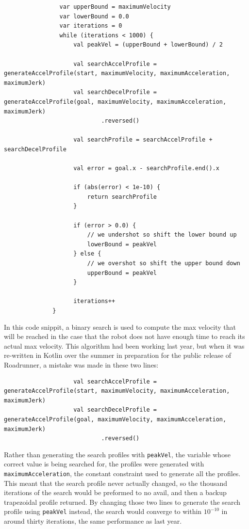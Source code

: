 \documentclass{article}
\begin{document}
\begin{lstlisting}
                var upperBound = maximumVelocity
                var lowerBound = 0.0
                var iterations = 0
                while (iterations < 1000) {
                    val peakVel = (upperBound + lowerBound) / 2

                    val searchAccelProfile = generateAccelProfile(start, maximumVelocity, maximumAcceleration, maximumJerk)
                    val searchDecelProfile = generateAccelProfile(goal, maximumVelocity, maximumAcceleration, maximumJerk)
                            .reversed()

                    val searchProfile = searchAccelProfile + searchDecelProfile

                    val error = goal.x - searchProfile.end().x

                    if (abs(error) < 1e-10) {
                        return searchProfile
                    }

                    if (error > 0.0) {
                        // we undershot so shift the lower bound up
                        lowerBound = peakVel
                    } else {
                        // we overshot so shift the upper bound down
                        upperBound = peakVel
                    }

                    iterations++
              }

\end{lstlisting}

In this code snippit, a binary search is used to compute the max velocity that will be reached in the case that the robot does not have enough time to reach its actual max velocity. This algorithm had been working last year, but when it was re-written in Kotlin over the summer in preparation for the public release of Roadrunner, a mistake was made in these two lines:

\begin{lstlisting}
                    val searchAccelProfile = generateAccelProfile(start, maximumVelocity, maximumAcceleration, maximumJerk)
                    val searchDecelProfile = generateAccelProfile(goal, maximumVelocity, maximumAcceleration, maximumJerk)
                            .reversed()
\end{lstlisting}

Rather than generating the search profiles with \texttt{peakVel}, the variable whose correct value is being searched for, the profiles were generated with \texttt{maximumAcceleration}, the constant constraint used to generate all the profiles. This meant that the search profile never actually changed, so the thousand iterations of the search would be preformed to no avail, and then a backup trapezoidal profile returned. By changing those two  lines to generate the search profile using \texttt{peakVel} instead, the search would converge to within $10^{-10}$ in around thirty iterations, the same performance as last year. 
\end{document}
